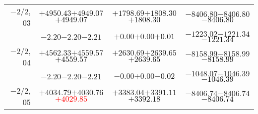 \documentclass[compress]{beamer}
\begin{document}
\begin{frame}
{\begin{tabular}{r | c | c | c}
$-$2/2, 03 & $+4950.43$\hspace{0.1 cm}$+4949.07$\hspace{0.1 cm}\textcolor{black}{$+4949.07$} & $+1798.69$\hspace{0.1 cm}$+1808.30$\hspace{0.1 cm}\textcolor{black}{$+1808.30$} & $-8406.80$\hspace{0.1 cm}$-8406.80$\hspace{0.1 cm}\textcolor{black}{$-8406.80$} \\
           & $-2.20$\hspace{0.1 cm}$-2.20$\hspace{0.1 cm}\textcolor{black}{$-2.21$} & $+0.00$\hspace{0.1 cm}$+0.00$\hspace{0.1 cm}\textcolor{black}{$+0.01$} & $-1223.02$\hspace{0.1 cm}$-1221.34$\hspace{0.1 cm}\textcolor{black}{$-1221.34$} \\
$-$2/2, 04 & $+4562.33$\hspace{0.1 cm}$+4559.57$\hspace{0.1 cm}\textcolor{black}{$+4559.57$} & $+2630.69$\hspace{0.1 cm}$+2639.65$\hspace{0.1 cm}\textcolor{black}{$+2639.65$} & $-8158.99$\hspace{0.1 cm}$-8158.99$\hspace{0.1 cm}\textcolor{black}{$-8158.99$} \\
           & $-2.20$\hspace{0.1 cm}$-2.20$\hspace{0.1 cm}\textcolor{black}{$-2.21$} & $-0.00$\hspace{0.1 cm}$+0.00$\hspace{0.1 cm}\textcolor{black}{$-0.02$} & $-1048.07$\hspace{0.1 cm}$-1046.39$\hspace{0.1 cm}\textcolor{black}{$-1046.39$} \\
$-$2/2, 05 & $+4034.79$\hspace{0.1 cm}$+4030.76$\hspace{0.1 cm}\textcolor{red}{$+4029.85$} & $+3383.04$\hspace{0.1 cm}$+3391.11$\hspace{0.1 cm}\textcolor{black}{$+3392.18$} & $-8406.74$\hspace{0.1 cm}$-8406.74$\hspace{0.1 cm}\textcolor{black}{$-8406.74$} \\

\end{tabular}}
\end{frame}
\end{document}
